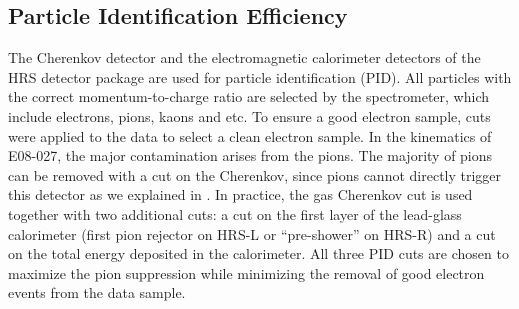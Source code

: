 \subsection{Particle Identification Efficiency}
\label{C7S2SS2}

The Cherenkov detector and the electromagnetic calorimeter detectors of the HRS detector package are used for particle identification (PID). All particles with the correct momentum-to-charge ratio are selected by the spectrometer, which include electrons, pions, kaons and etc. To ensure a good electron sample, cuts were applied to the data to select a clean electron sample. In the kinematics of E08-027, the major contamination arises from the pions. The majority of pions can be removed with a cut on the Cherenkov, since pions cannot directly trigger this detector as we explained in . In practice, the gas Cherenkov cut is used together with two additional cuts: a cut on the first layer of the lead-glass calorimeter (first pion rejector on HRS-L or ``pre-shower'' on HRS-R) and a cut on the total energy deposited in the calorimeter. All three PID cuts are chosen to maximize the pion suppression while minimizing the removal of good electron events from the data sample.

